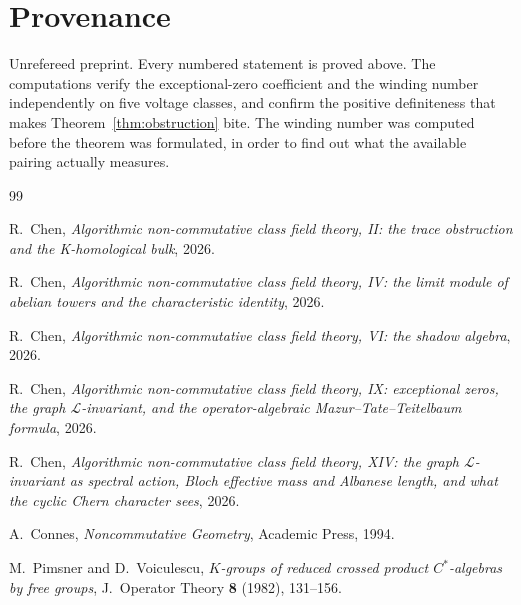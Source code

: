 \documentclass[11pt]{amsart}
\numberwithin{equation}{section}
\theoremstyle{definition}
\theoremstyle{remark}
\newcommand{\cL}{\mathcal{L}}
\begin{document}
\section*{Provenance}

Unrefereed preprint. Every numbered statement is proved above. The computations verify
the exceptional-zero coefficient and the winding number independently on five voltage
classes, and confirm the positive definiteness that makes
Theorem~\ref{thm:obstruction} bite. The winding number was computed before the theorem was
formulated, in order to find out what the available pairing actually measures.

\begin{thebibliography}{99}

 R.~Chen, \emph{Algorithmic non-commutative class field theory, II: the trace
obstruction and the K-homological bulk}, 2026.

 R.~Chen, \emph{Algorithmic non-commutative class field theory, IV: the limit
module of abelian towers and the characteristic identity}, 2026.

 R.~Chen, \emph{Algorithmic non-commutative class field theory, VI: the shadow
algebra}, 2026.

 R.~Chen, \emph{Algorithmic non-commutative class field theory, IX:
exceptional zeros, the graph $\cL$-invariant, and the operator-algebraic
Mazur--Tate--Teitelbaum formula}, 2026.

 R.~Chen, \emph{Algorithmic non-commutative class field theory, XIV: the
graph $\cL$-invariant as spectral action, Bloch effective mass and Albanese length, and
what the cyclic Chern character sees}, 2026.

 A.~Connes, \emph{Noncommutative Geometry}, Academic Press, 1994.

 M.~Pimsner and D.~Voiculescu, \emph{$K$-groups of reduced crossed product
$C^*$-algebras by free groups}, J.\ Operator Theory \textbf{8} (1982), 131--156.

\end{thebibliography}
\end{document}
